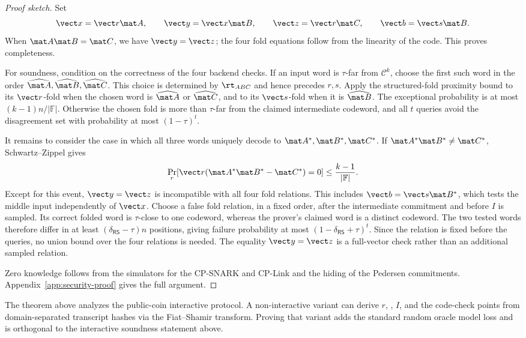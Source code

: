 \begin{revblock}
\begin{proof}[Proof sketch]
Set
\[
  \vect x=\vect r\mat A,\qquad
  \vect y=\vect x\mat B,\qquad
  \vect z=\vect r\mat C,\qquad
  \vect b=\vect s\mat B.
\]
When \(\mat A\mat B=\mat C\), we have \(\vect y=\vect z\); the four fold
equations follow from the linearity of the code.  This proves completeness.

For soundness, condition on the correctness of the four backend checks.  If an
input word is \(\tau\)-far from \(\mathcal C^k\), choose the first such word in
the order \(\widehat{\mat A},\widehat{\mat B},\widehat{\mat C}\).  This choice
is determined by \(\rt_{ABC}\) and hence precedes \(r,s\).  Apply the
structured-fold proximity bound to its \(\vect r\)-fold when the chosen word is
\(\widehat{\mat A}\) or \(\widehat{\mat C}\), and to its \(\vect s\)-fold when
it is \(\widehat{\mat B}\).  The exceptional probability is at most
\((k-1)n/|\mathbb F|\).  Otherwise the chosen fold is more than \(\tau\)-far
from the claimed intermediate codeword, and all \(t\) queries avoid the
disagreement set with probability at most \((1-\tau)^t\).

It remains to consider the case in which all three words uniquely decode to
\(\mat A^*,\mat B^*,\mat C^*\).  If
\(\mat A^*\mat B^*\ne\mat C^*\), Schwartz--Zippel gives
\[
 \Pr_r[\vect r(\mat A^*\mat B^*-\mat C^*)=0]
 \le\frac{k-1}{|\mathbb F|}.
\]
Except for this event, \(\vect y=\vect z\) is incompatible with all four fold
relations.  This includes \(\vect b=\vect s\mat B^*\), which tests the middle
input independently of \(\vect x\).  Choose a false fold relation, in a fixed
order, after the intermediate commitment and before \(I\) is sampled.  Its
correct folded word is \(\tau\)-close to one codeword, whereas the prover's
claimed word is a distinct codeword.  The two tested words therefore differ
in at least \((\delta_{\mathsf{RS}}-\tau)n\) positions, giving failure
probability at most \((1-\delta_{\mathsf{RS}}+\tau)^t\).  Since the relation is
fixed before the queries, no union bound over the four relations is needed.
The equality \(\vect y=\vect z\) is a full-vector check rather than an
additional sampled relation.

Zero knowledge follows from the simulators for the CP-SNARK and CP-Link and the
hiding of the Pedersen commitments.  Appendix~\ref{app:security-proof} gives
the full argument.
\end{proof}

\begin{remark}
The theorem above analyzes the public-coin interactive protocol.  A
non-interactive variant can derive \(r\), , \(I\), and the code-check points from
domain-separated transcript hashes via the Fiat--Shamir transform.  Proving
that variant adds the standard random oracle model loss and is orthogonal to
the interactive soundness statement above.
\end{remark}
\end{revblock}

